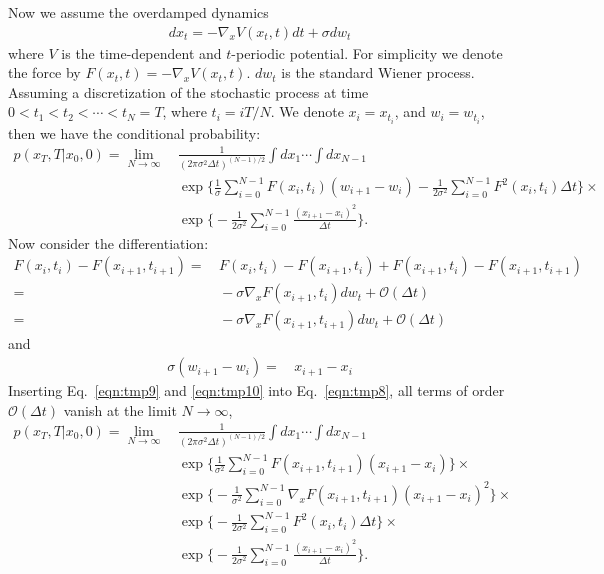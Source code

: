\documentclass[aip,jcp,preprint,unsortedaddress,a4paper,onecolumn]{revtex4-1}
\newcommand{\mo}[0]{\mathcal {O}}
\newcommand{\dt}[0]{\Delta t}
\begin{document}
Now we assume the overdamped dynamics
\begin{align}
  dx_t = -\nabla_x V(x_t,t) dt + \sigma dw_t
\end{align}
where $V$ is the time-dependent and $t$-periodic potential. For simplicity we denote the force by $F(x_t,t) = -\nabla_x V(x_t, t)$. $dw_t$ is
the standard Wiener process.  Assuming a discretization of the
stochastic process at time $0 < t_1 < t_2 < \cdots < t_N = T$, where
$t_i = iT / N$. We denote $x_i = x_{t_i}$, and $w_i = w_{t_i}$, then we have the
conditional probability:
\begin{align}\nonumber
  p(x_T,T\vert x_0,0) =\lim_{N\rightarrow\infty} &\,
  \frac{1}{(2\pi\sigma^2\dt)^{(N-1)/2}} \int dx_1\cdots\int dx_{N-1}\\\nonumber
  &\,
  \exp\bigg\{\frac1\sigma\sum_{i=0}^{N-1} F(x_i,t_i)(w_{i+1} - w_{i}) - \frac1{2\sigma^2}\sum_{i=0}^{N-1}F^2(x_i,t_i)\dt\bigg\} \times\\\label{eqn:tmp8}
  &\,
  \exp\bigg\{- \frac1{2\sigma^2} \sum_{i=0}^{N-1} \frac{(x_{i+1} - x_i)^2}{\dt}\bigg\}.
\end{align}
Now consider the differentiation:
\begin{align}\nonumber
  F(x_i,t_i) - F(x_{i+1},t_{i+1}) =
  &\,
  F(x_i,t_i) - F(x_{i+1},t_{i}) + F(x_{i+1},t_{i}) -  F(x_{i+1},t_{i+1})\\\nonumber
  =&\,
  -\sigma\nabla_x F(x_{i+1},t_{i})dw_t + \mo(\dt) \\\label{eqn:tmp9}
  =&\,
  -\sigma\nabla_x F(x_{i+1},t_{i+1})dw_t + \mo(\dt) 
\end{align}
and
\begin{align}\label{eqn:tmp10}
  \sigma(w_{i+1} - w_{i}) =
  &\,
  x_{i+1} - x_i 
\end{align}
Inserting Eq.~\eqref{eqn:tmp9} and \eqref{eqn:tmp10} into Eq.~\eqref{eqn:tmp8}, all terms of order $\mo(\dt)$ vanish at the limit $N\rightarrow\infty$,
\begin{align}\nonumber
  p(x_T,T\vert x_0,0) =\lim_{N\rightarrow\infty} &\,
  \frac{1}{(2\pi\sigma^2\dt)^{(N-1)/2}} \int dx_1\cdots\int dx_{N-1}\\\nonumber
  &\,
  \exp\bigg\{\frac1{\sigma^2}\sum_{i=0}^{N-1} F(x_{i+1},t_{i+1})(x_{i+1} - x_i) \bigg\} \times \\ \nonumber
  &\,
  \exp\bigg\{-\frac{1}{\sigma^2}\sum_{i=0}^{N-1}  \nabla_x F(x_{i+1},t_{i+1}) (x_{i+1} - x_{i})^2\bigg\} \times \\\nonumber
  &\,
  \exp\bigg\{-\frac1{2\sigma^2}\sum_{i=0}^{N-1}F^2(x_i,t_i)\dt\bigg\} \times\\\label{eqn:tmp11}
  &\,
  \exp\bigg\{- \frac1{2\sigma^2} \sum_{i=0}^{N-1} \frac{(x_{i+1} - x_i)^2}{\dt}\bigg\}.
\end{align}
\end{document}
